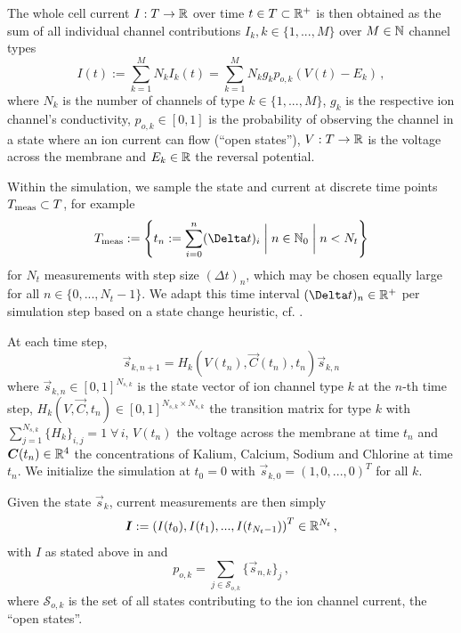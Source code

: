 The whole cell current $I: T \rightarrow \mathbb{R}$ over time $t \in T \subset \mathbb{R}^+$ is then obtained as the sum of all individual channel contributions $I_k, k \in \{1, ..., M\}$ over $M \in \mathbb{N}$ channel types
\begin{equation}
  I(t) := \sum_{k=1}^{M} N_k I_k(t) = \sum_{k=1}^{M} N_k g_k p_{o,k} \left(V(t)-E_k\right)\,,
  \label{eq:current}
\end{equation}
where $N_k$ is the number of channels of type $k \in \{1, ..., M\}$, $g_k$ is the respective ion channel's conductivity, $p_{o, k} \in [0, 1]$ is the probability of observing the channel in a state where an ion current can flow (``open states''), $V: T \rightarrow \mathbb{R}$ is the voltage across the membrane and $E_k \in \mathbb{R}$ the reversal potential.

Within the simulation, we sample the state and current at discrete time points $T_{\rm meas} \subset T$, for example
$$T_{\rm meas} := \left\{t_n := \sum_{i=0}^n (\Delta t)_i \;\bigg|\; n \in \N_0 \;\bigg|\; n < N_t\right\}$$
for $N_t$ measurements with step size $(\Delta t)_n$, which may be chosen equally large for all $n \in \{0, ..., N_t - 1\}$.
We adapt this time interval $(\Delta t)_n \in \R^+$ per simulation step based on a state change heuristic, cf. .

At each time step,
\begin{equation}
  \vec{s}_{k,n+1} = H_{k}\left(V(t_n), \vec{C}(t_n), t_n\right) \vec{s}_{k,n}
\end{equation}
where $\vec{s}_{k,n} \in [0, 1]^{N_{s,k}}$ is the state vector of ion channel type $k$ at the $n$-th time step, $H_{k}\left(V, \vec{C}, t_n\right) \in [0, 1]^{N_{s,k} \times N_{s,k}}$ the transition matrix for type $k$ with $\sum_{j=1}^{N_{s,k}} \{H_k\}_{i,j} = 1 \;\forall\,i$, $V(t_n)$ the voltage across the membrane at time $t_n$ and ${\bm{C}}(t_n) \in \mathbb{R}^4$ the concentrations of Kalium, Calcium, Sodium and Chlorine at time $t_n$.
We initialize the simulation at $t_0 = 0$ with $\vec{s}_{k,0} = (1, 0, ..., 0)^T$ for all $k$.

Given the state $\vec{s}_{k}$, current measurements are then simply
$${\bm{I}} := \left(I(t_0), I(t_1), ..., I(t_{N_t-1})\right)^T \in \mathbb{R}^{N_t}\,,$$
with $I$ as stated above in  and
$$p_{o,k} = \sum_{j \in \mathcal{S}_{o,k}} \{\vec{s}_{n,k}\}_{j}\,,$$
where $\mathcal{S}_{o,k}$ is the set of all states contributing to the ion channel current, the ``open states''.

